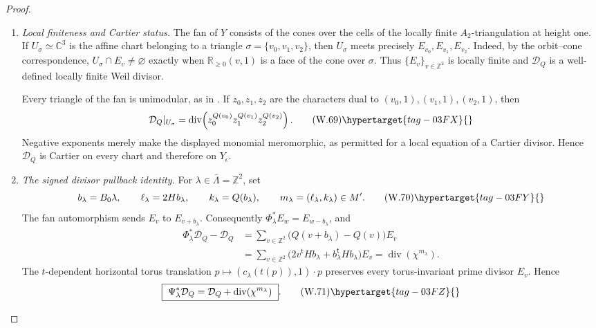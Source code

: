 \begin{proof}
\begin{enumerate}[label=\arabic*.,leftmargin=*]
\item \emph{Local finiteness and Cartier status.}
The fan of \(Y\) consists of the cones over the cells of the locally finite
\(A_2\)-triangulation at height one.  If
\(U_\sigma\simeq\mathbb C^3\) is the affine chart belonging to a triangle
\(\sigma=\{v_0,v_1,v_2\}\), then \(U_\sigma\) meets precisely
\(E_{v_0},E_{v_1},E_{v_2}\).  Indeed, by the orbit--cone
correspondence, \(U_\sigma\cap E_v\ne\varnothing\) exactly when
\(\mathbb R_{\geq0}(v,1)\) is a face of the cone over \(\sigma\).
Thus \(\{E_v\}_{v\in\mathbb Z^2}\) is locally finite and
\(\mathcal D_Q\) is a well-defined locally finite Weil divisor.

Every triangle of the fan is unimodular, as in
.  If \(z_0,z_1,z_2\) are the
characters dual to
\((v_0,1),(v_1,1),(v_2,1)\), then
\[
 \mathcal D_Q|_{U_\sigma}
 =\operatorname{div}\!
   \left(z_0^{Q(v_0)}z_1^{Q(v_1)}z_2^{Q(v_2)}\right).
\tag{W.69}\hypertarget{tag-03FX}{}\label{wbII:eq:W:5.17ab}
\]
Negative exponents merely make the displayed monomial meromorphic, as
permitted for a local equation of a Cartier divisor.  Hence
\(\mathcal D_Q\) is Cartier on every chart and therefore on
\(Y_\epsilon\).

\item \emph{The signed divisor pullback identity.}
For \(\lambda\in\bar\Lambda=\mathbb Z^2\), set
\[
 b_\lambda=B_0\lambda,
 \qquad
 \ell_\lambda=2Hb_\lambda,
 \qquad
 k_\lambda=Q(b_\lambda),
 \qquad
 m_\lambda=(\ell_\lambda,k_\lambda)\in M'.
\tag{W.70}\hypertarget{tag-03FY}{}\label{wbII:eq:W:5.17ac}
\]
The fan automorphism sends \(E_v\) to \(E_{v+b_\lambda}\).
Consequently \(\Phi_\lambda^*E_w=E_{w-b_\lambda}\), and
\begin{align*}
 \Phi_\lambda^*\mathcal D_Q-\mathcal D_Q
 &=\sum_{v\in\mathbb Z^2}
   \bigl(Q(v+b_\lambda)-Q(v)\bigr)E_v\\
 &=\sum_{v\in\mathbb Z^2}
   \bigl(2v^{\mathsf t}Hb_\lambda+
         b_\lambda^{\mathsf t}Hb_\lambda\bigr)E_v
 =\operatorname{div}(\chi^{m_\lambda}).
\end{align*}
The \(t\)-dependent horizontal torus translation
\(p\mapsto(c_\lambda(t(p)),1)\cdot p\) preserves every
torus-invariant prime divisor \(E_v\).  Hence
\[
 \boxed{\ 
 \Psi_\lambda^*\mathcal D_Q
 =\mathcal D_Q+\operatorname{div}(\chi^{m_\lambda})\ }.
\tag{W.71}\hypertarget{tag-03FZ}{}\label{wbII:eq:W:5.17ad}
\]


\end{enumerate}
\end{proof}

